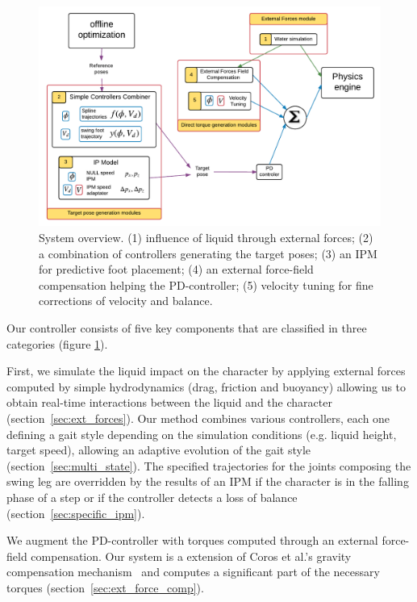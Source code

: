 \documentclass[conference]{acmsiggraph}
\begin{document}
\begin{figure}[t]
\centering
\includegraphics[scale=0.45]{images/general_process.pdf}
\caption{System overview. (1) influence of liquid through external forces; (2) a combination of controllers generating the target poses; (3) an IPM for predictive foot placement; (4) an external force-field compensation helping the PD-controller; (5) velocity tuning for fine corrections of velocity and balance.}
\label{fig:shema_controler}
\end{figure}

Our controller consists of five key components that are classified in three categories (figure \ref{fig:shema_controler}).

First, we simulate the liquid impact on the character by applying external forces computed by simple hydrodynamics (drag, friction and buoyancy) allowing us to obtain real-time interactions between the liquid and the character (section~\ref{sec:ext_forces}). Our method combines various controllers, each one defining a gait style depending on the simulation conditions (e.g. liquid height, target speed), allowing an adaptive evolution of the gait style (section~\ref{sec:multi_state}). The specified trajectories for the joints composing the swing leg are overridden by the results of an IPM if the character is in the falling phase of a step or if the controller detects a loss of balance (section~\ref{sec:specific_ipm}).

We augment the PD-controller with torques computed through an external force-field compensation. Our system is a extension of Coros et al.'s gravity compensation mechanism~\cite{coros2010generalized} and computes a significant part of the necessary torques (section~\ref{sec:ext_force_comp}).
\end{document}
